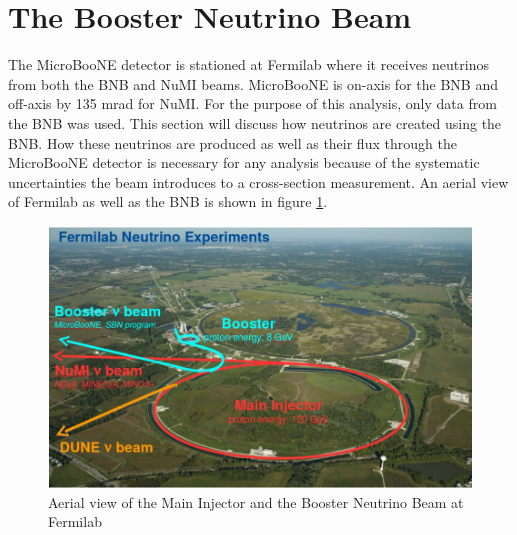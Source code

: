 \section{The Booster Neutrino Beam}
The MicroBooNE detector is stationed at Fermilab where it receives neutrinos from both the BNB and NuMI beams. MicroBooNE is on-axis for the BNB and off-axis by 135 mrad for NuMI. For the purpose of this analysis, only data from the BNB was used. This section will discuss how neutrinos are created using the BNB. How these neutrinos are produced as well as their flux through the MicroBooNE detector is necessary for any analysis because of the systematic uncertainties the beam introduces to a cross-section measurement. An aerial view of Fermilab as well as the BNB is shown in figure \ref{fig:fnal}.

\begin{figure}[htp!]
\centering
\includegraphics[width=\textwidth]{figs/fnal.png}
\caption{Aerial view of the Main Injector and the Booster Neutrino Beam at Fermilab}
\label{fig:fnal}
\end{figure}

